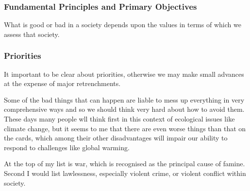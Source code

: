 \documentclass[14pt,titlepage]{extarticle}
\begin{document}
\subsubsection{Fundamental Principles and Primary Objectives}

What is good or bad in a society depends upon the values in terms of which we assess that society.



\subsubsection{Priorities}

It important to be clear about priorities, otherwise we may make small advances at the expense of major retrenchments.

Some of the bad things that can happen are liable to mess up everything in very comprehensive ways and so we should think very hard about how to avoid them.
These days many people wll think first in this context of ecological issues like climate change, but it seems to me that there are even worse things than that on the cards, which among their other disadvantages will impair our ability to respond to challenges like global warming.

At the top of my list is war, which is recognised as the principal cause of famine.
Second I would list lawlessness, especially violent crime, or violent conflict within society.


%
%






\end{document}

